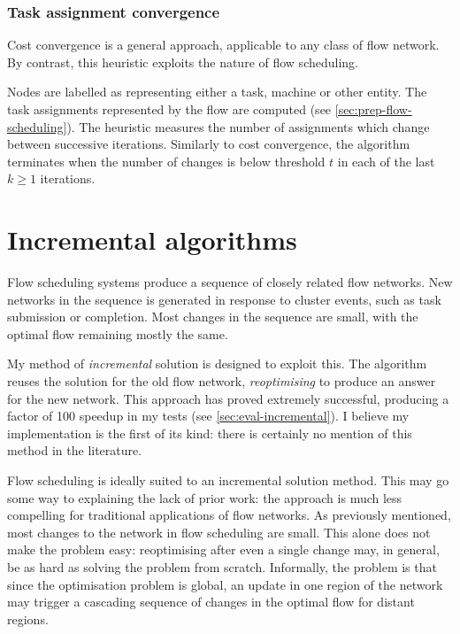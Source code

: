 \subsubsection{Task assignment convergence}

Cost convergence is a general approach, applicable to any class of flow network. By contrast, this heuristic exploits the nature of flow scheduling.

Nodes are labelled as representing either a task, machine or other entity. The task assignments represented by the flow are computed (see \cref{sec:prep-flow-scheduling}). The heuristic measures the number of assignments which change between successive iterations. Similarly to cost convergence, the algorithm terminates when the number of changes is below threshold $t$ in each of the last $k \geq 1$ iterations.


\section{Incremental algorithms} \label{sec:impl-incremental}

Flow scheduling systems produce a sequence of closely related flow networks. New networks in the sequence is generated in response to cluster events, such as task submission or completion. Most changes in the sequence are small, with the optimal flow remaining mostly the same.

My method of \emph{incremental} solution is designed to exploit this. The algorithm reuses the solution for the old flow network, \emph{reoptimising} to produce an answer for the new network. This approach has proved extremely successful, producing a factor of 100 speedup in my tests (see \cref{sec:eval-incremental}). I believe my implementation is the first of its kind: there is certainly no mention of this method in the literature.

Flow scheduling is ideally suited to an incremental solution method. This may go some way to explaining the lack of prior work: the approach is much less compelling for traditional applications of flow networks. As previously mentioned, most changes to the network in flow scheduling are small. This alone does not make the problem easy: reoptimising after even a single change may, in general, be as hard as solving the problem from scratch\footnotemark. Informally, the problem is that since the optimisation problem is global, an update in one region of the network may trigger a cascading sequence of changes in the optimal flow for distant regions.

